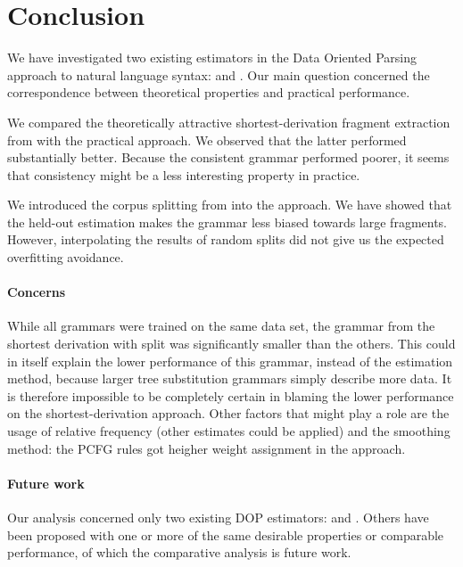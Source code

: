 \section{Conclusion}

We have investigated two existing estimators in the Data Oriented Parsing approach to natural language syntax: \ddop{} and \dops. Our main question concerned the correspondence between theoretical properties and practical performance. 

We compared the theoretically attractive shortest-derivation fragment extraction from \dops{} with the practical \ddop{} approach. 
We observed that the latter performed substantially better. Because the consistent grammar performed poorer, it seems that consistency might be a less interesting property in practice.

We introduced the corpus splitting from \dops{} into the \ddop{} approach.  We have showed that the held-out estimation makes the grammar less biased towards large fragments. However, interpolating the results of random splits did not give us the expected overfitting avoidance. 

\paragraph{Concerns}
While all grammars were trained on the same data set, the grammar from the shortest derivation with split was significantly smaller than the others. This could in itself explain the lower performance of this grammar, instead of the estimation method, because larger tree substitution grammars simply describe more data. It is therefore impossible to be completely certain in blaming the lower performance on the shortest-derivation approach. Other factors that might play a role are the usage of relative frequency (other estimates could be applied) and the smoothing method: the PCFG rules got heigher weight assignment in the \ddop{} approach. 


\paragraph{Future work}
Our analysis concerned only two existing DOP estimators: \ddop{} and \dops{}. Others have been proposed with one or more of the same desirable properties or comparable performance, of which the comparative analysis is future work.

